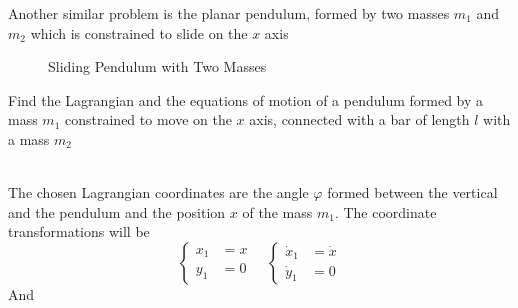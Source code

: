\documentclass[../admech.tex]{subfiles}
\begin{document}
\begin{exe}
	Another similar problem is the planar pendulum, formed by two masses $m_1$ and $m_2$ which is constrained to slide on the $x$ axis\\
	\begin{minipage}[c]{0.5\textwidth}
		\begin{figure}[H]
		\centering
			\caption{Sliding Pendulum with Two Masses}
		\end{figure}
	\end{minipage}
	\begin{minipage}[r]{0.5\textwidth}
		Find the Lagrangian and the equations of motion of a pendulum formed by a mass $m_1$ constrained to move on the $x$ axis, connected with a bar of length $l$ with a mass $m_2$
	\end{minipage}\\
	The chosen Lagrangian coordinates are the angle $\varphi$ formed between the vertical and the pendulum and the position $x$ of the mass $m_1$. The coordinate transformations will be
	\begin{equation}
		\left\{ \begin{aligned}
			x_1&=x\\
			y_1&=0
	\end{aligned}\right.\quad\left\{ \begin{aligned}
			\dot{x}_1&=\dot{x}\\
			\dot{y}_1&=0
	\end{aligned}\right.
		\label{eq:spt1}
	\end{equation}
	And
	\begin{equation}

\end{equation}
\end{exe}
\end{document}
